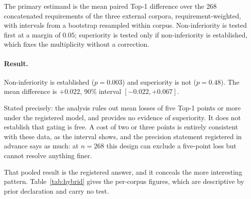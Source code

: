 \documentclass[a4paper,fleqn]{cas-sc}
\begin{document}
The primary estimand is the mean paired Top-1 difference over the 268 concatenated requirements of the three external corpora, requirement-weighted, with intervals from a bootstrap resampled within corpus. Non-inferiority is tested first at a margin of $0.05$; superiority is tested only if non-inferiority is established, which fixes the multiplicity without a correction.

\paragraph{Result.}
Non-inferiority is established ($p = 0.003$) and superiority is not ($p = 0.48$). The mean difference is $+0.022$, 90\% interval $[-0.022, +0.067]$.

Stated precisely: the analysis rules out mean losses of five Top-1 points or more under the registered model, and provides no evidence of superiority. It does not establish that gating is free. A cost of two or three points is entirely consistent with these data, as the interval shows, and the precision statement registered in advance says as much: at $n = 268$ this design can exclude a five-point loss but cannot resolve anything finer.

That pooled result is the registered answer, and it conceals the more interesting pattern. Table~\ref{tab:hybrid} gives the per-corpus figures, which are descriptive by prior declaration and carry no test.

\begin{table}[htbp]
\caption{Gated hybrid against the dual-encoder alone, Top-1. The pooled contrast is the registered primary result; per-corpus rows are descriptive by prior declaration.}
\label{tab:hybrid}
\centering
\setlength{\tabcolsep}{3pt}
\small
{}
\end{table}
\end{document}
